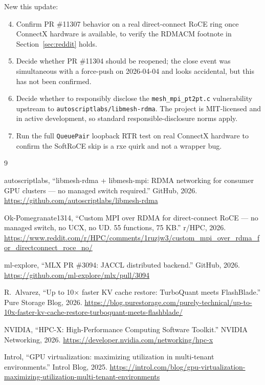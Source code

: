 \documentclass[11pt]{article}
\begin{document}
New this update:

\begin{enumerate}
  \setcounter{enumi}{3}
  \item Confirm PR \#11307 behavior on a real direct-connect RoCE ring
        once ConnectX hardware is available, to verify the RDMACM
        footnote in Section~\ref{sec:reddit} holds.
  \item Decide whether PR \#11304 should be reopened; the close event
        was simultaneous with a force-push on 2026-04-04 and looks
        accidental, but this has not been confirmed.
  \item Decide whether to responsibly disclose the
        \texttt{mesh\_mpi\_pt2pt.c} vulnerability upstream to
        \texttt{autoscriptlabs/libmesh-rdma}. The project is MIT-licensed
        and in active development, so standard responsible-disclosure
        norms apply.
  \item Run the full \texttt{QueuePair} loopback RTR test on real
        ConnectX hardware to confirm the SoftRoCE skip is a rxe quirk
        and not a wrapper bug.
\end{enumerate}

\begin{thebibliography}{9}

autoscriptlabs, ``libmesh-rdma + libmesh-mpi: RDMA networking for
consumer GPU clusters --- no managed switch required.'' GitHub, 2026.
\url{https://github.com/autoscriptlabs/libmesh-rdma}

Ok-Pomegranate1314, ``Custom MPI over RDMA for direct-connect RoCE ---
no managed switch, no UCX, no UD. 55 functions, 75 KB.'' r/HPC, 2026.
\url{https://www.reddit.com/r/HPC/comments/1ruzjw3/custom_mpi_over_rdma_for_directconnect_roce_no/}

ml-explore, ``MLX PR \#3094: JACCL distributed backend.'' GitHub, 2026.
\url{https://github.com/ml-explore/mlx/pull/3094}

R.~Alvarez, ``Up to 10$\times$ faster KV cache restore: TurboQuant
meets FlashBlade.'' Pure Storage Blog, 2026.
\url{https://blog.purestorage.com/purely-technical/up-to-10x-faster-kv-cache-restore-turboquant-meets-flashblade/}

NVIDIA, ``HPC-X: High-Performance Computing Software Toolkit.''
NVIDIA Networking, 2026.
\url{https://developer.nvidia.com/networking/hpc-x}

Introl, ``GPU virtualization: maximizing utilization in multi-tenant
environments.'' Introl Blog, 2025.
\url{https://introl.com/blog/gpu-virtualization-maximizing-utilization-multi-tenant-environments}

\end{thebibliography}
\end{document}
